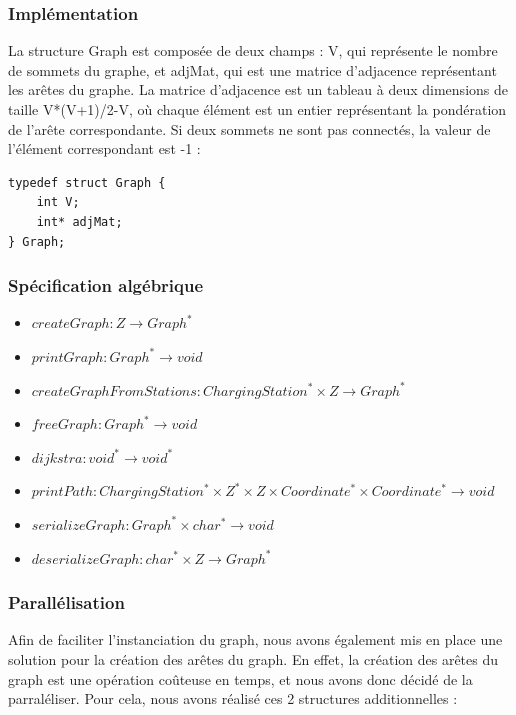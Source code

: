 \documentclass[french,a4paper]{article}
\begin{document}
\subsubsection{Implémentation}
La structure Graph est composée de deux champs : V, qui représente le nombre de sommets du graphe, et adjMat, qui est une matrice d'adjacence représentant les arêtes du graphe. La matrice d'adjacence est un tableau à deux dimensions de taille V*(V+1)/2-V, où chaque élément est un entier représentant la pondération de l'arête correspondante. Si deux sommets ne sont pas connectés, la valeur de l'élément correspondant est -1 : \\

\begin{center}
    \begin{lstlisting}[caption=Structure du Graph]
typedef struct Graph {
    int V; 
    int* adjMat;
} Graph;
        \end{lstlisting}
\end{center}

\subsubsection{Spécification algébrique}

\begin{itemize}
    \item $createGraph : {Z} \rightarrow Graph^*$
    \item $printGraph : Graph^* \rightarrow void$
    \item $createGraphFromStations : ChargingStation^* \times {Z} \rightarrow Graph^*$
    \item $freeGraph : Graph^* \rightarrow void$
    \item $dijkstra : void^* \rightarrow void^*$
    \item $printPath : ChargingStation^* \times {Z}^* \times {Z} \times Coordinate^* \times Coordinate^* \rightarrow void$
    \item $serializeGraph : Graph^* \times char^* \rightarrow void$
    \item $deserializeGraph : char^* \times {Z} \rightarrow Graph^*$
\end{itemize}

\subsubsection{Parallélisation}

Afin de faciliter l'instanciation du graph, nous avons également mis en place une solution pour la création des arêtes du graph. En effet, la création des arêtes du graph est une opération coûteuse en temps, et nous avons donc décidé de la parraléliser. Pour cela, nous avons réalisé ces 2 structures additionnelles :
\end{document}

